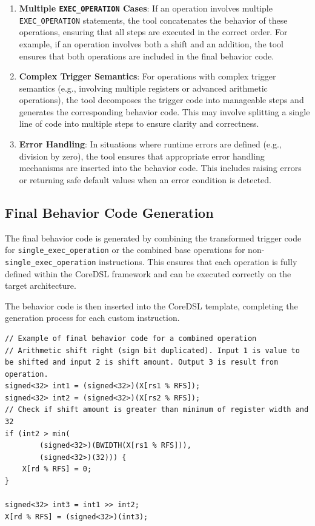 \begin{enumerate}
    \item \textbf{Multiple \texttt{EXEC\_OPERATION} Cases}: If an operation involves multiple \texttt{EXEC\_OPERATION} statements, the tool concatenates the behavior of these operations, ensuring that all steps are executed in the correct order. For example, if an operation involves both a shift and an addition, the tool ensures that both operations are included in the final behavior code.

    \item \textbf{Complex Trigger Semantics}: For operations with complex trigger semantics (e.g., involving multiple registers or advanced arithmetic operations), the tool decomposes the trigger code into manageable steps and generates the corresponding behavior code. This may involve splitting a single line of code into multiple steps to ensure clarity and correctness.

    \item \textbf{Error Handling}: In situations where runtime errors are defined (e.g., division by zero), the tool ensures that appropriate error handling mechanisms are inserted into the behavior code. This includes raising errors or returning safe default values when an error condition is detected.
\end{enumerate}

\subsection{Final Behavior Code Generation}

The final behavior code is generated by combining the transformed trigger code for \texttt{single\_exec\_operation} or the combined base operations for non-\texttt{single\_exec\_operation} instructions. This ensures that each operation is fully defined within the CoreDSL framework and can be executed correctly on the target architecture.

The behavior code is then inserted into the CoreDSL template, completing the generation process for each custom instruction.

\begin{lstlisting}
// Example of final behavior code for a combined operation
// Arithmetic shift right (sign bit duplicated). Input 1 is value to be shifted and input 2 is shift amount. Output 3 is result from operation.
signed<32> int1 = (signed<32>)(X[rs1 % RFS]);
signed<32> int2 = (signed<32>)(X[rs2 % RFS]);
// Check if shift amount is greater than minimum of register width and 32
if (int2 > min(
        (signed<32>)(BWIDTH(X[rs1 % RFS])),
        (signed<32>)(32))) {
    X[rd % RFS] = 0;
}

signed<32> int3 = int1 >> int2;
X[rd % RFS] = (signed<32>)(int3);
\end{lstlisting}

